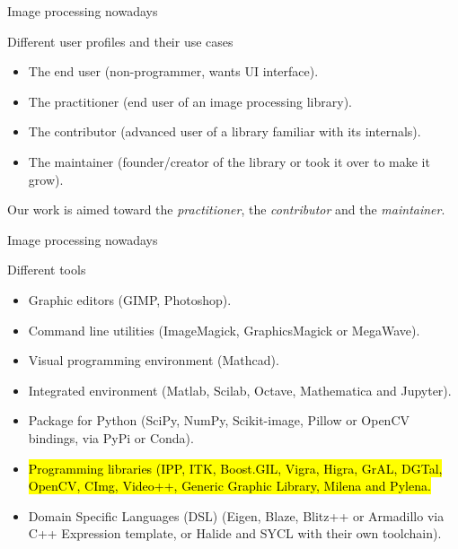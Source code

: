 \documentclass[12pt,aspectratio=169]{beamer}
\makeatletter
\let\HL\hl
\renewcommand\hl{%
  \let\set@color\beamerorig@set@color
  \let\reset@color\beamerorig@reset@color
  \HL}
\makeatother
\begin{document}
\begin{frame}[fragile]{Image processing nowadays}
  \begin{alertblock}{Different user profiles and their use cases}
    \begin{itemize}
      \item The end user (non-programmer, wants UI interface).
      \item The practitioner (end user of an image processing library).
      \item The contributor (advanced user of a library familiar with its internals).
      \item The maintainer (founder/creator of the library or took it over to make it grow).
    \end{itemize}
  \end{alertblock}

  Our work is aimed toward the \emph{practitioner}, the \emph{contributor} and the \emph{maintainer}.
\end{frame}

\begin{frame}[fragile]{Image processing nowadays}
  \begin{alertblock}{Different tools}
    \begin{itemize}
      \item Graphic editors (GIMP, Photoshop).
      \item Command line utilities (ImageMagick, GraphicsMagick or MegaWave).
      \item Visual programming environment (Mathcad).
      \item Integrated environment (Matlab, Scilab, Octave, Mathematica and Jupyter).
      \item Package for Python (SciPy, NumPy, Scikit-image, Pillow or OpenCV bindings, via PyPi or Conda).
      \item \hl{Programming libraries (IPP, ITK, Boost.GIL, Vigra, Higra, GrAL, DGTal, OpenCV, CImg, Video++, Generic
              Graphic Library, Milena and Pylena.}
      \item Domain Specific Languages (DSL) (Eigen, Blaze, Blitz++ or Armadillo via C++ Expression template, or Halide
            and SYCL with their own toolchain).
    \end{itemize}
  \end{alertblock}
\end{frame}
\end{document}
